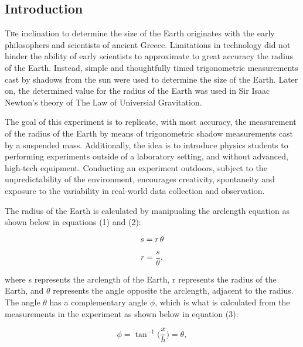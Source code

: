 \documentclass[twoside,10pt]{article}
\begin{document}
	\begin{multicols}{2} %
		
		\section{Introduction} 
		\lettrine[nindent=0em,lines=2]{T}he inclination to determine the size of the Earth originates with the early philosophers and scientists of ancient Greece. Limitations in technology did not hinder the ability of early scientists to approximate to great accuracy the radius of the Earth. Instead, simple and thoughtfully timed trigonometric measurements cast by shadows from the sun were used to determine the size of the Earth. Later on, the determined value for the radius of the Earth was used in Sir Isaac Newton's theory of The Law of Universial Gravitation. 
		
		\indent The goal of this experiment is to replicate, with most accuracy, the measurement of the radius of the Earth by means of trigonometric shadow measurements cast by a suspended mass. Additionally, the idea is to introduce physics students to performing experiments outside of a laboratory setting, and without advanced, high-tech equipment. Conducting an experiment outdoors, subject to the unpredictability of the environment, encourages creativity, spontaneity and exposure to the variability in real-world data collection and observation. 
		
		\indent The radius of the Earth is calculated by manipualing the arclength equation as shown below in equations (1) and (2):
		
		\begin{equation}
		s = r\hspace{.5mm}\theta 
		\end{equation}

		\begin{equation}
		r = \frac{s}{\theta},
		\end{equation}
		
		\noindent where s represents the arclength of the Earth, r represents the radius of the Earth, and $\theta$ represents the angle opposite the arclength, adjacent to the radius. The angle $\theta$ has a complementary angle $\phi$, which is what is calculated from the measurements in the experiment as shown below in equation (3):
		
		\begin{equation}
			\phi = \tan^{-1} \biggl( \frac{x}{h} \biggl)= \theta,
		\end{equation}
		

\end{multicols}
\end{document}
